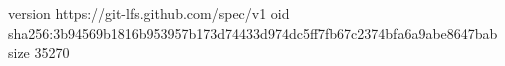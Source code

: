 version https://git-lfs.github.com/spec/v1
oid sha256:3b94569b1816b953957b173d74433d974dc5ff7fb67c2374bfa6a9abe8647bab
size 35270

